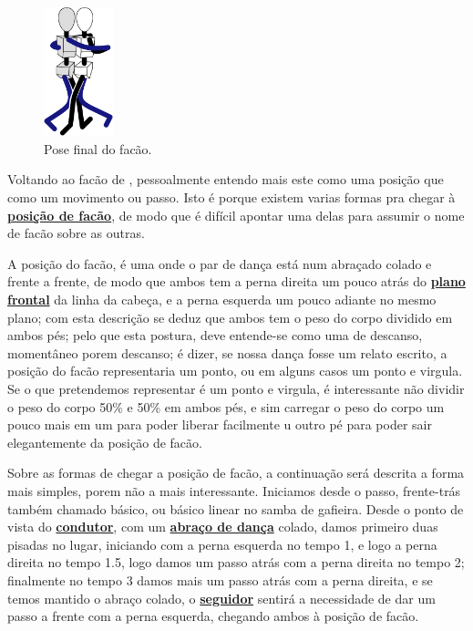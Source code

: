 \begin{figure}
  \vspace{-10pt}
  \centering
    \includegraphics[width=0.18\textwidth]{chapters/cap-historia-passos/facao.eps}
  \caption{Pose final do facão.}
  \label{fig:facaostickman}
  \vspace{-10pt}
\end{figure}
Voltando ao facão de \AnoLivro, pessoalmente entendo mais este como uma posição que 
como um movimento ou passo. 
Isto é porque existem varias formas pra chegar à \hyperref[def:facao-position]{\textbf{posição de facão}},
de modo que é difícil apontar uma delas para assumir o nome de facão sobre as outras.

A posição do facão, é uma onde o par de dança está num abraçado colado e frente a frente, 
de modo que ambos tem a perna direita um pouco atrás do \hyperref[def:PlanoFrontal]{\textbf{plano frontal}} da linha da cabeça,
e a perna esquerda um pouco adiante no mesmo plano; com esta descrição se deduz 
que ambos tem o peso do corpo dividido em ambos pés; pelo que esta postura,
deve entende-se como uma de descanso, momentâneo porem descanso;
é dizer, se nossa dança fosse um relato escrito, a posição do facão
representaria um ponto, ou em alguns casos um ponto e virgula.
Se o que pretendemos representar é um ponto e virgula, 
é interessante não dividir o peso do corpo 50\% e 50\% em ambos pés,
e sim carregar o peso do corpo um pouco mais em um 
para poder liberar facilmente u outro pé para poder sair elegantemente da posição de facão.  

Sobre as formas de chegar a posição de facão, a continuação será descrita a forma mais simples,
porem não a mais interessante. Iniciamos desde o passo, frente-trás também chamado básico, 
ou básico linear no samba de gafieira. Desde o ponto de vista do \hyperref[def:Condutor]{\textbf{condutor}}, 
com um \hyperref[def:abracodedanca]{\textbf{abraço de dança}} colado,
damos primeiro duas pisadas no lugar, iniciando com a perna esquerda no tempo 1, e logo a perna direita no tempo 1.5,
logo damos um passo atrás com a perna direita no tempo 2; 
finalmente no tempo 3 damos mais um passo atrás com a perna direita, 
e se temos mantido o abraço colado, 
o \hyperref[def:Seguidor]{\textbf{seguidor}} sentirá a necessidade de dar um passo a frente com a perna esquerda,
chegando ambos à posição de facão.  

